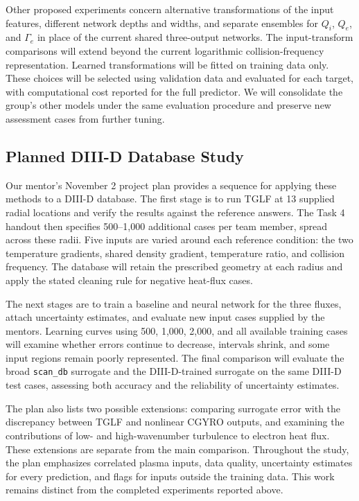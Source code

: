 \documentclass[12pt,letterpaper]{article}
\begin{document}
Other proposed experiments concern alternative transformations of the input
features, different network depths and widths, and separate ensembles for
$Q_i$, $Q_e$, and $\Gamma_e$ in place of the current shared three-output
networks. The input-transform comparisons will extend beyond the current
logarithmic collision-frequency representation. Learned transformations will
be fitted on training data only. These choices will be selected using
validation data and evaluated for each target, with computational cost
reported for the full predictor. We will consolidate the group's other models
under the same evaluation procedure and preserve new assessment cases from
further tuning.

\subsection{Planned DIII-D Database Study}

Our mentor's November 2 project plan provides a sequence for applying these
methods to a DIII-D database. The first stage is to run TGLF at 13 supplied
radial locations and verify the results against the reference answers. The
Task 4 handout then specifies 500--1,000 additional cases per team member,
spread across these radii. Five inputs are varied around each reference
condition: the two temperature gradients, shared density gradient,
temperature ratio, and collision frequency. The database will retain the
prescribed geometry at each radius and apply the stated cleaning rule for
negative heat-flux cases.

The next stages are to train a baseline and neural network for the three
fluxes, attach uncertainty estimates, and evaluate new input cases supplied
by the mentors. Learning curves using 500, 1,000, 2,000, and all available
training cases will examine whether errors continue to decrease, intervals
shrink, and some input regions remain poorly represented. The final comparison
will evaluate the broad \texttt{scan\_db} surrogate and the DIII-D-trained
surrogate on the same DIII-D test cases, assessing both accuracy and the
reliability of uncertainty estimates.

The plan also lists two possible extensions: comparing surrogate error with
the discrepancy between TGLF and nonlinear CGYRO outputs, and examining the
contributions of low- and high-wavenumber turbulence to electron heat flux.
These extensions are separate from the main comparison. Throughout the
study, the plan emphasizes correlated plasma inputs, data quality, uncertainty
estimates for every prediction, and flags for inputs outside the training
data. This work remains distinct from the completed experiments reported above.

\clearpage
\makereference


\end{document}

